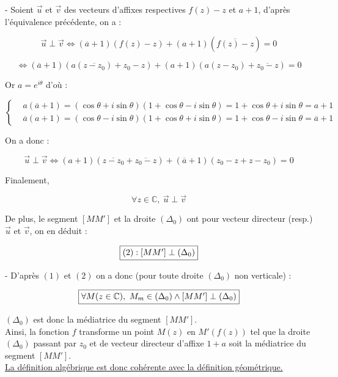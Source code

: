 \documentclass{article}
\begin{document}
    - Soient $\vec{u}$ et $\vec{v}$ des vecteurs d'affixes respectives $f(z) - z$ et $a + 1$, d'après l'équivalence précédente, on a : 

    $$\vec{u} \perp \vec{v} \Leftrightarrow (\overline{a} + 1) (f(z) - z) + (a + 1) (\overline{f(z) - z}) = 0$$

    $$\Leftrightarrow (\overline{a} + 1) (a(\overline{z - z_0}) + z_0 - z) + (a + 1) (a(z - z_0) + \overline{z_0 - z}) = 0$$

    Or $a = e^{i\theta}$ d'où : 

    \begin{equation*}
        \left \{
        \begin{aligned}
          &a(\overline{a} + 1) = (\cos{\theta} + i\sin{\theta}) (1 + \cos{\theta} - i\sin{\theta}) = 1 + \cos{\theta} + i\sin{\theta} = a + 1 \\
          &\overline{a}(a + 1) = (\cos{\theta} - i\sin{\theta}) (1 + \cos{\theta} + i\sin{\theta}) = 1 + \cos{\theta} - i\sin{\theta} = \overline{a} + 1
        \end{aligned} \right.
    \end{equation*} 

    On a donc :

    $$\vec{u} \perp \vec{v} \Leftrightarrow (a + 1) (\overline{z - z_0} + \overline{z_0 - z}) 
    +
     (\overline{a} + 1) (z_0 - z + z - z_0) = 0$$

    Finalement,

    $$\forall z \in \mathbb{C}, \ \vec{u} \perp \vec{v}$$

    De plus, le segment $[MM']$ et la droite $(\Delta_0)$ ont pour vecteur directeur (resp.) $\vec{u}$ et $\vec{v}$, 
    on en déduit :

    $$\fbox{$(2) : [MM'] \perp (\Delta_0)$}$$

    - D'après $(1)$ et $(2)$ on a donc (pour toute droite $(\Delta_0)$ non verticale) :

    $$\fbox{$\forall M(z \in \mathbb{C}), \ M_m \in (\Delta_0) \land [MM'] \perp (\Delta_0)$}$$

    $(\Delta_0)$ est donc la médiatrice du segment $[MM']$. \\

    
    Ainsi, la fonction $f$ transforme un point $M(z)$ 
    en $M'(f(z))$ tel que la droite $(\Delta_0)$ passant par $z_0$ et de vecteur directeur d'affixe $1 + a$ soit 
    la médiatrice du segment $[MM']$. \\ 
    \underline{La définition algébrique est donc cohérente avec la définition géométrique.}


    
\end{document}
